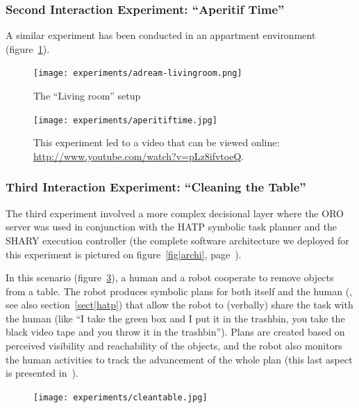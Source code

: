 \subsubsection{Second Interaction Experiment: ``Aperitif Time''}
\label{sect|expe2}

A similar experiment has been conducted in an appartment environment
(figure~\ref{fig|livingroom}).


\begin{figure}
    \centering
    \texttt{[image: experiments/adream-livingroom.png]}
    \caption{The ``Living room'' setup}
    \label{fig|livingroom}
\end{figure}


\begin{figure}
    \centering
    \texttt{[image: experiments/aperitiftime.jpg]}
    \caption{This experiment led to a video that can be viewed online:
\url{http://www.youtube.com/watch?v=pLz8ifvtoeQ}.}
    \label{fig|aperitif-video}
\end{figure}



\subsubsection{Third Interaction Experiment: ``Cleaning the Table''}
\label{sect|expe3}

The third experiment involved a more complex decisional layer where the ORO
server was used in conjunction with the HATP symbolic task planner and the
SHARY execution controller (the complete software architecture we deployed for
this experiment is pictured on figure~\ref{fig|archi},
page~\pageref{fig|archi}).

In this scenario (figure~\ref{fig|cleantable-video}), a human and a robot
cooperate to remove objects from a table. The robot produces symbolic plans for
both itself and the human (\cite{Alami2011}, see also section~\ref{sect|hatp})
that allow the robot to (verbally) share the task with the human (like ``I take
the green box and I put it in the trashbin, you take the black video tape and
you throw it in the trashbin''). Plans are created based on perceived
visibility and reachability of the objects, and the robot also monitors the
human activities to track the advancement of the whole plan (this last aspect
is presented in~\cite{Warnier2012}).

\begin{figure}
    \centering
    \texttt{[image: experiments/cleantable.jpg]}
    \caption{}
    \label{fig|cleantable-video}
\end{figure}


